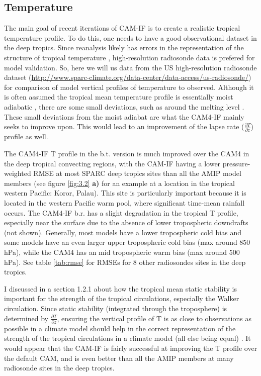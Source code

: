 \documentclass[letterpaper,12pt,titlepage,oneside,final]{book}
\begin{document}
\subsection{Temperature}
The main goal of recent iterations of CAM-IF is to create a realistic tropical temperature profile. To do this, one needs to have a good observational dataset in the deep tropics. Since reanalysis likely has errors in the representation of the structure of tropical temperature \citep{mitas_recent_2006}, high-resolution radiosonde data is prefered for model validation. So, here we will us data from the US high-resolution radiosonde dataset (\url{http://www.sparc-climate.org/data-center/data-access/us-radiosonde/}) for comparison of model vertical profiles of temperature to observed. Although it is often assumed the tropical mean temperature profile is essentially moist adiabatic \citep{emanuel_quasi-equilibrium_2007}, there are some small deviations, such as around the melting level \citep{folkins_melting_2013}. These small deviations from the moist adiabat are what the CAM4-IF mainly seeks to improve upon. This would lead to an improvement of the lapse rate ($\frac{\partial{T}}{\partial{z}}$) profile as well. 

The CAM4-IF T profile in the b.t. version is much improved over the CAM4 in the deep tropical convecting regions, with the CAM-IF having a lower pressure-weighted RMSE at most SPARC deep tropics sites than all the AMIP model members (see figure \ref{fig:3.2} \textbf{a)} for an example at a location in the tropical western Pacific: Koror, Palau). This site is particularly important because it is located in the western Pacific warm pool, where significant time-mean rainfall occurs. The CAM4-IF b.r. has a slight degradation in the tropical T profile, especially near the surface due to the absence of lower tropospheric downdrafts (not shown). Generally, most models have a lower tropospheric cold bias and some models have an even larger upper tropospheric cold bias (max around 850 hPa), while the CAM4 has an mid tropospheric warm bias (max around 500 hPa). See table \ref{tab:rmse} for RMSEs for 8 other radiosondes sites in the deep tropics.

I discussed in a section 1.2.1 about how the tropical mean static stability is important for the strength of the tropical circulations, especially the Walker circulation. Since static stability (integrated through the troposphere) is determined by $\frac{\partial{T}}{\partial{z}}$, ensuring the vertical profile of T is as close to observations as possible in a climate model should help in the correct representation of the strength of the tropical circulations in a climate model (all else being equal) \citep{sohn_role_2016,mitas_recent_2006}. It would appear that the CAM-IF is fairly successful at improving the T profile over the default CAM, and is even better than all the AMIP members at many radiosonde sites in the deep tropics. 
\end{document}
